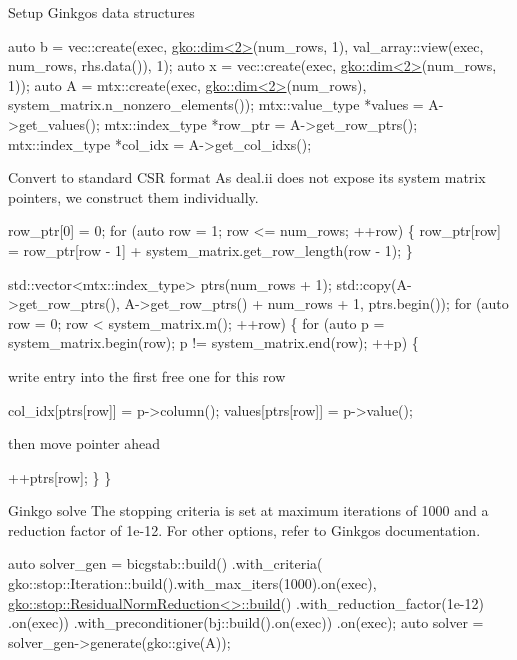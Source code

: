 Setup Ginkgo\textquotesingle{}s data structures


\begin{DoxyCode}
\textcolor{keyword}{auto} b = vec::create(exec, \hyperlink{structgko_1_1dim}{gko::dim<2>}(num\_rows, 1),
                     val\_array::view(exec, num\_rows, rhs.data()), 1);
\textcolor{keyword}{auto} x = vec::create(exec, \hyperlink{structgko_1_1dim}{gko::dim<2>}(num\_rows, 1));
\textcolor{keyword}{auto} A = mtx::create(exec, \hyperlink{structgko_1_1dim}{gko::dim<2>}(num\_rows),
                     system\_matrix.n\_nonzero\_elements());
mtx::value\_type *values = A->get\_values();
mtx::index\_type *row\_ptr = A->get\_row\_ptrs();
mtx::index\_type *col\_idx = A->get\_col\_idxs();
\end{DoxyCode}


Convert to standard C\+SR format As deal.\+ii does not expose its system matrix pointers, we construct them individually.


\begin{DoxyCode}
row\_ptr[0] = 0;
\textcolor{keywordflow}{for} (\textcolor{keyword}{auto} row = 1; row <= num\_rows; ++row) \{
    row\_ptr[row] = row\_ptr[row - 1] + system\_matrix.get\_row\_length(row - 1);
\}

std::vector<mtx::index\_type> ptrs(num\_rows + 1);
std::copy(A->get\_row\_ptrs(), A->get\_row\_ptrs() + num\_rows + 1,
          ptrs.begin());
\textcolor{keywordflow}{for} (\textcolor{keyword}{auto} row = 0; row < system\_matrix.m(); ++row) \{
    \textcolor{keywordflow}{for} (\textcolor{keyword}{auto} p = system\_matrix.begin(row); p != system\_matrix.end(row);
         ++p) \{
\end{DoxyCode}


write entry into the first free one for this row


\begin{DoxyCode}
col\_idx[ptrs[row]] = p->column();
values[ptrs[row]] = p->value();
\end{DoxyCode}


then move pointer ahead


\begin{DoxyCode}
        ++ptrs[row];
    \}
\}
\end{DoxyCode}


Ginkgo solve The stopping criteria is set at maximum iterations of 1000 and a reduction factor of 1e-\/12. For other options, refer to Ginkgo\textquotesingle{}s documentation.


\begin{DoxyCode}
\textcolor{keyword}{auto} solver\_gen =
    bicgstab::build()
        .with\_criteria(
            gko::stop::Iteration::build().with\_max\_iters(1000).on(exec),
            \hyperlink{classgko_1_1stop_1_1ResidualNormReduction}{gko::stop::ResidualNormReduction<>::build}()
                .with\_reduction\_factor(1e-12)
                .on(exec))
        .with\_preconditioner(bj::build().on(exec))
        .on(exec);
\textcolor{keyword}{auto} solver = solver\_gen->generate(gko::give(A));
\end{DoxyCode}



